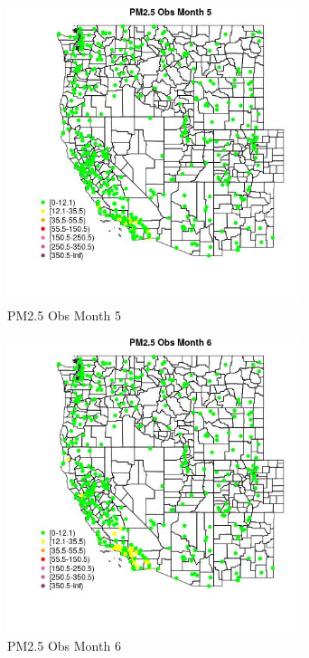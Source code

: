 \begin{figure} 
\centering  
\includegraphics[width=0.77\textwidth]{Code_Outputs/Report_ML_input_PM25_Step4_part_e_de_duplicated_aveswNAs_MapObsMo5PM25_Obs.jpg} 
\caption{\label{fig:Report_ML_input_PM25_Step4_part_e_de_duplicated_aveswNAsMapObsMo5PM25_Obs}PM2.5 Obs Month 5} 
\end{figure} 
 

\begin{figure} 
\centering  
\includegraphics[width=0.77\textwidth]{Code_Outputs/Report_ML_input_PM25_Step4_part_e_de_duplicated_aveswNAs_MapObsMo6PM25_Obs.jpg} 
\caption{\label{fig:Report_ML_input_PM25_Step4_part_e_de_duplicated_aveswNAsMapObsMo6PM25_Obs}PM2.5 Obs Month 6} 
\end{figure} 
 

